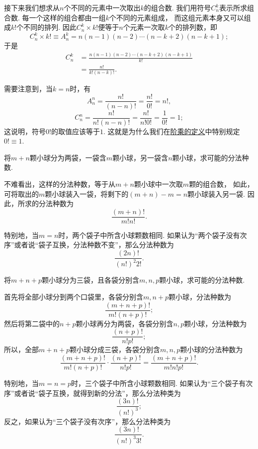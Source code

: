 接下来我们想求从\(n\)个不同的元素中一次取出\(k\)的组合数.
我们用符号\(C_n^k\)表示所求组合数.
每一个这样的组合都由一组\(k\)个不同的元素组成，
而这组元素本身又可以组成\(k!\)个不同的排列.
因此\(C_n^k \times k!\)便等于\(n\)个元素一次取\(k\)个的排列数，即\[
	C_n^k \times k! \equiv A_n^k
	= n(n-1)(n-2)\dotsm(n-k+2)(n-k+1);
\]于是\begin{align}
	C_n^k &= \frac{n(n-1)(n-2)\dotsm(n-k+2)(n-k+1)}{k!} \\
	&= \frac{n!}{k! (n-k)!}.
\end{align}

需要注意到，当\(k=n\)时，有\[
	A_n^n = \frac{n!}{(n-n)!} = \frac{n!}{0!} = n!,
\]\[
	C_n^n = \frac{n!}{n! (n-n)!} = \frac{n!}{n! 0!} = \frac{1}{0!} = 1;
\]
这说明，符号\(0!\)的取值应该等于\(1\).
这就是为什么我们在\hyperref[definition:数列.阶乘的定义]{阶乘的定义}中特别规定\(0!\equiv1\).

\begin{example}
将\(m+n\)颗小球分为两袋，一袋含\(m\)颗小球，另一袋含\(n\)颗小球，求可能的分法种数.
\begin{solution}
不难看出，这样的分法种数，等于从\(m+n\)颗小球中一次取\(m\)颗的组合数，
如此，可将取出的\(m\)颗小球装入一袋，将剩下的\((m+n)-m=n\)颗小球装入另一袋.
因此，所求的分法种数为\[
	\frac{(m+n)!}{m! n!}.
\]

特别地，当\(m=n\)时，两个袋子中所含小球颗数相同.
如果认为“两个袋子没有次序”或者说“袋子互换，分法种数不变”，那么分法种数为\[
	\frac{(2n)!}{(n!)^2 2!}.
\]
\end{solution}
\end{example}

\begin{example}
将\(m+n+p\)颗小球分为三袋，且各袋分别含\(m,n,p\)颗小球，求可能的分法种数.
\begin{solution}
首先将全部小球分到两个口袋里，各袋分别含\(m,n+p\)颗小球，分法种数为\[
	\frac{(m+n+p)!}{m!(n+p)!};
\]
然后将第二袋中的\(n+p\)颗小球再分为两袋，各袋分别含\(n,p\)颗小球，分法种数为\[
	\frac{(n+p)!}{n! p!};
\]
所以，全部\(m+n+p\)颗小球分成三袋，各袋分别含\(m,n,p\)颗小球的分法种数为\[
	\frac{(m+n+p)!}{m!(n+p)!} \cdot \frac{(n+p)!}{n! p!}
	= \frac{(m+n+p)!}{m! n! p!}.
\]

特别地，当\(m=n=p\)时，三个袋子中所含小球颗数相同.
如果认为“三个袋子有次序”或者说“袋子互换，就得到新的分法”，那么分法种类为\[
	\frac{(3n)!}{(n!)^3};
\]
反之，如果认为“三个袋子没有次序”，那么分法种类为\[
	\frac{(3n)!}{(n!)^3 3!}.
\]
\end{solution}
\end{example}

